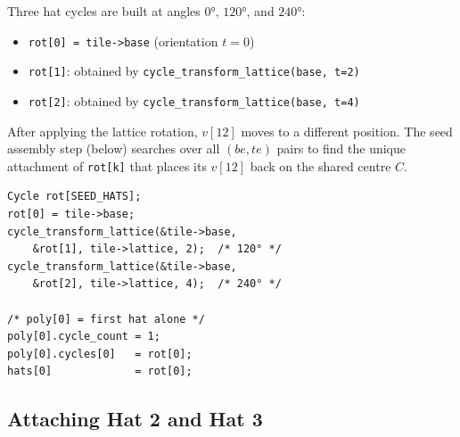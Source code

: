 \documentclass[10pt,a4paper]{article}
\let\polysubsection\subsection
\renewcommand\subsection{\needspace{0.12\textheight}\polysubsection}
\newcommand{\code}[1]{\texttt{\small #1}}
\begin{document}
\begin{tcolorbox}[dualbox, title={\code{build\_symmetric\_seed} — overview}]
  Three hat cycles are built at angles $0°$, $120°$, and $240°$:
  \begin{itemize}
    \item \code{rot[0] = tile->base} (orientation $t=0$)
    \item \code{rot[1]}: obtained by \code{cycle\_transform\_lattice(base,\,t=2)}
    \item \code{rot[2]}: obtained by \code{cycle\_transform\_lattice(base,\,t=4)}
  \end{itemize}
  After applying the lattice rotation, $v[12]$ moves to a different position.
  The seed assembly step (below) searches over all $(be, te)$ pairs to find
  the unique attachment of \code{rot[k]} that places its $v[12]$
  back on the shared centre $C$.
\tcblower
\begin{verbatim}
Cycle rot[SEED_HATS];
rot[0] = tile->base;
cycle_transform_lattice(&tile->base,
    &rot[1], tile->lattice, 2);  /* 120° */
cycle_transform_lattice(&tile->base,
    &rot[2], tile->lattice, 4);  /* 240° */

/* poly[0] = first hat alone */
poly[0].cycle_count = 1;
poly[0].cycles[0]   = rot[0];
hats[0]             = rot[0];
\end{verbatim}
\end{tcolorbox}

\subsection{Attaching Hat 2 and Hat 3}
\end{document}

